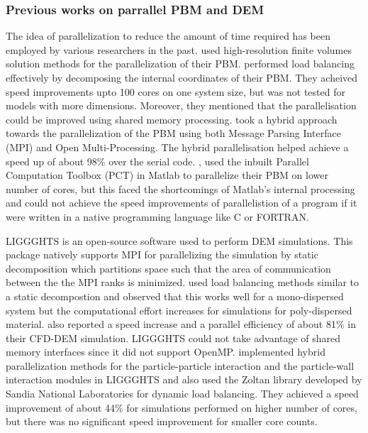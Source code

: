 \documentclass[preprint,11pt,authoryear]{elsarticle}
\begin{document}
\subsubsection{Previous works on parrallel PBM and DEM}
\par  The idea of parallelization to reduce the amount of time required has been employed by various 
researchers in the past. \cite{Gunawan2008} used high-resolution finite volumes solution methods for 
the parallelization of their PBM. \cite{Gunawan2008} performed load balancing effectively by 
decomposing the internal coordinates of their PBM. They acheived speed improvements upto 100 
cores on one system size, but was not tested for models with more dimensions. Moreover, they 
mentioned that the parallelisation could be improved using shared memory processing. 
\cite{Bettencourt2017} took a hybrid approach towards the parallelization of the PBM using both 
Message Parsing Interface (MPI) and Open Multi-Processing. The hybrid parallelisation helped achieve 
a speed up of about 98\% over the serial code. \cite{Prakash2013a},\cite{Prakash2013b} used the 
inbuilt Parallel Computation Toolbox (PCT) in Matlab to parallelize their PBM on lower number of cores, 
but this faced the shortcomings of Matlab's internal processing and could not achieve the speed 
improvements of parallelistion of a program if it were written in a native programming language like C 
or FORTRAN. 
\par  LIGGGHTS is an open-source software used to perform DEM simulations. This package natively 
supports MPI for parallelizing the simulation by static decomposition which partitions space such that 
the area of communication between the the MPI ranks is minimized. \cite{kacianauskas2010} used 
load balancing methods similar to a static decompostion and observed that this works well for a 
mono-dispersed system but the computational effort increases for simulations for poly-dispersed 
material. \cite{Gopalakrishnan2013} also reported a speed increase and a parallel efficiency of about 
81\% in their CFD-DEM simulation. LIGGGHTS could not take advantage of shared memory interfaces 
since it did not support OpenMP. \cite{Berger2015} implemented hybrid parallelization methods for the 
particle-particle interaction and the particle-wall interaction modules in LIGGGHTS and also used the 
Zoltan library \citep{Boman2012} developed by Sandia National Laboratories for dynamic load 
balancing. They achieved a speed improvement of about 44\% for simulations performed on higher 
number of cores, but there was no significant speed improvement for smaller core counts. 
\end{document}
